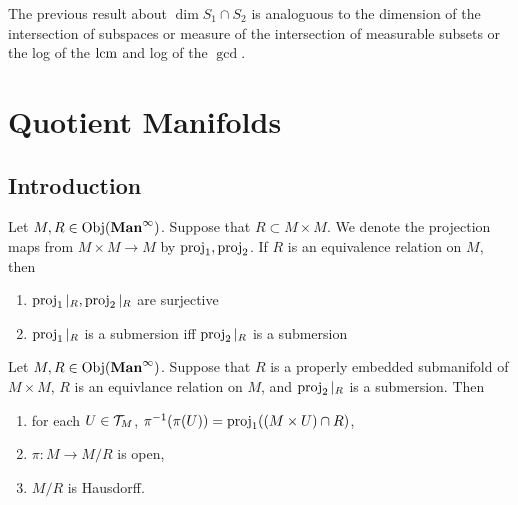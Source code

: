 \documentclass{book}
\begin{document}
	\begin{note}
		The previous result about $\dim S_1 \cap S_2$ is analoguous to the dimension of the intersection of subspaces or measure of the intersection of measurable subsets or the log of the $\text{lcm}$ and log of the $\gcd$.
	\end{note}
	
	
	
	
	
	
	
	
	
	
	
	
	
	
	
	
	
	
	
	
	
	
	
	
	
	
	
	
	
	
	
	
	
	
	\newpage
	\chapter{Quotient Manifolds}
	
	\section{Introduction}
	
	\begin{note}
		Let $M, R \in \operatorname{Obj}(\operatorname*{\text{\textbf{Man}}^{\infty}})$. Suppose that $R \subset M \times M$. We denote the projection maps from $M \times M \rightarrow M$ by $\operatorname{\text{proj}}_1, \operatorname{\text{proj}}_2$. If $R$ is an equivalence relation on $M$, then 
		\begin{enumerate}
			\item $\operatorname{\text{proj}}_1|_R, \operatorname{\text{proj}}_2|_R$ are surjective
			\item $\operatorname{\text{proj}}_1|_R$ is a submersion iff $\operatorname{\text{proj}}_2|_R$ is a submersion
		\end{enumerate}
	\end{note}
	
	
	\begin{ex} 
		Let $M, R \in \operatorname{Obj}(\operatorname*{\text{\textbf{Man}}^{\infty}})$. Suppose that $R$ is a properly embedded submanifold of $M \times M$, $R$ is an equivlance relation on $M$, and $\operatorname{\text{proj}}_2|_R$ is a submersion. Then 
		\begin{enumerate}
			\item for each $U \in \mathcal{T}_M$, $\pi^{-1}(\pi(U)) = \operatorname{\text{proj}}_1((M \times U) \cap R)$,
			\item $\pi:M \rightarrow M /R$ is open,
			\item $M / R$ is Hausdorff.
		\end{enumerate}
	\end{ex}
\end{document}
